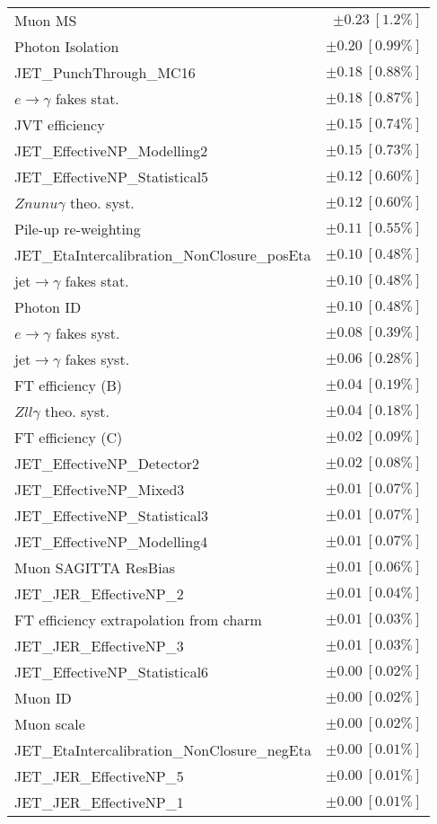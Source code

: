\begin{tabular}{lr}
Muon MS & $\pm 0.23\ [1.2\%]$ \\
Photon Isolation & $\pm 0.20\ [0.99\%]$ \\
JET\_PunchThrough\_MC16 & $\pm 0.18\ [0.88\%]$ \\
$e\to\gamma$ fakes stat. & $\pm 0.18\ [0.87\%]$ \\
JVT efficiency & $\pm 0.15\ [0.74\%]$ \\
JET\_EffectiveNP\_Modelling2 & $\pm 0.15\ [0.73\%]$ \\
JET\_EffectiveNP\_Statistical5 & $\pm 0.12\ [0.60\%]$ \\
$Znunu\gamma$ theo. syst. & $\pm 0.12\ [0.60\%]$ \\
Pile-up re-weighting & $\pm 0.11\ [0.55\%]$ \\
JET\_EtaIntercalibration\_NonClosure\_posEta & $\pm 0.10\ [0.48\%]$ \\
jet$\to\gamma$ fakes stat. & $\pm 0.10\ [0.48\%]$ \\
Photon ID & $\pm 0.10\ [0.48\%]$ \\
$e\to\gamma$ fakes syst. & $\pm 0.08\ [0.39\%]$ \\
jet$\to\gamma$ fakes syst. & $\pm 0.06\ [0.28\%]$ \\
FT efficiency (B) & $\pm 0.04\ [0.19\%]$ \\
$Zll\gamma$ theo. syst. & $\pm 0.04\ [0.18\%]$ \\
FT efficiency (C) & $\pm 0.02\ [0.09\%]$ \\
JET\_EffectiveNP\_Detector2 & $\pm 0.02\ [0.08\%]$ \\
JET\_EffectiveNP\_Mixed3 & $\pm 0.01\ [0.07\%]$ \\
JET\_EffectiveNP\_Statistical3 & $\pm 0.01\ [0.07\%]$ \\
JET\_EffectiveNP\_Modelling4 & $\pm 0.01\ [0.07\%]$ \\
Muon SAGITTA ResBias & $\pm 0.01\ [0.06\%]$ \\
JET\_JER\_EffectiveNP\_2 & $\pm 0.01\ [0.04\%]$ \\
FT efficiency extrapolation from charm & $\pm 0.01\ [0.03\%]$ \\
JET\_JER\_EffectiveNP\_3 & $\pm 0.01\ [0.03\%]$ \\
JET\_EffectiveNP\_Statistical6 & $\pm 0.00\ [0.02\%]$ \\
Muon ID & $\pm 0.00\ [0.02\%]$ \\
Muon scale & $\pm 0.00\ [0.02\%]$ \\
JET\_EtaIntercalibration\_NonClosure\_negEta & $\pm 0.00\ [0.01\%]$ \\
JET\_JER\_EffectiveNP\_5 & $\pm 0.00\ [0.01\%]$ \\
JET\_JER\_EffectiveNP\_1 & $\pm 0.00\ [0.01\%]$ \\
\hline
\end{tabular}
